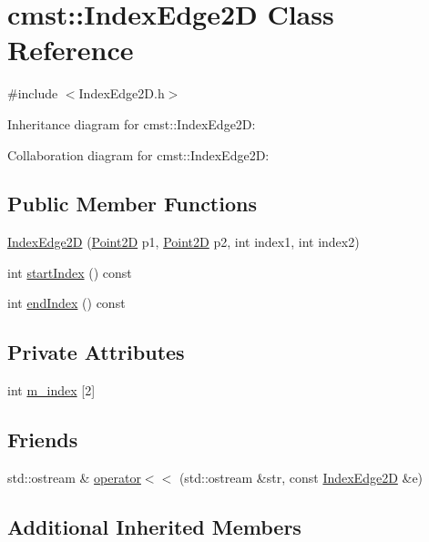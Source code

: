 \hypertarget{classcmst_1_1_index_edge2_d}{}\section{cmst::IndexEdge2D Class Reference}
\label{classcmst_1_1_index_edge2_d}


{\ttfamily \#include $<$IndexEdge2D.h$>$}



Inheritance diagram for cmst::IndexEdge2D:


Collaboration diagram for cmst::IndexEdge2D:
\subsection*{Public Member Functions}
\begin{DoxyCompactItemize}
\item 
\hyperlink{classcmst_1_1_index_edge2_d_aa01ca9e529a319fffb5f500ab7218ef6}{IndexEdge2D} (\hyperlink{classcmst_1_1_point2_d}{Point2D} p1, \hyperlink{classcmst_1_1_point2_d}{Point2D} p2, int index1, int index2)
\item 
int \hyperlink{classcmst_1_1_index_edge2_d_ab92c0b814ea9c354a71acfc84c871f72}{startIndex} () const 
\item 
int \hyperlink{classcmst_1_1_index_edge2_d_ad50c559d38e5857c03be255774deff12}{endIndex} () const 
\end{DoxyCompactItemize}
\subsection*{Private Attributes}
\begin{DoxyCompactItemize}
\item 
int \hyperlink{classcmst_1_1_index_edge2_d_a38fdada0cc5c0807ec7970cda8705428}{m\_index} \mbox{[}2\mbox{]}
\end{DoxyCompactItemize}
\subsection*{Friends}
\begin{DoxyCompactItemize}
\item 
std::ostream \& \hyperlink{classcmst_1_1_index_edge2_d_a07a17f57bc3f2f18232965531f0b62b4}{operator$<$$<$} (std::ostream \&str, const \hyperlink{classcmst_1_1_index_edge2_d}{IndexEdge2D} \&e)
\end{DoxyCompactItemize}
\subsection*{Additional Inherited Members}


